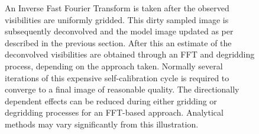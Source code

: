 \begin{figure}[h]
\begin{mdframed}
{ An Inverse Fast Fourier Transform is taken after the observed visibilities are uniformly gridded. This dirty sampled image is subsequently deconvolved and the model image updated as per 
 described in the previous section. After this an estimate of the deconvolved visibilities are obtained through an FFT and degridding process, depending on the approach taken. Normally several iterations 
 of this expensive self-calibration cycle is required to converge to a final image of reasonable quality. The directionally dependent effects can be reduced during either gridding 
 or degridding processes for an FFT-based approach. Analytical methods may vary significantly from this illustration.}
 \label{fig_image_cycle}
 \end{mdframed}
 \end{figure}
 
